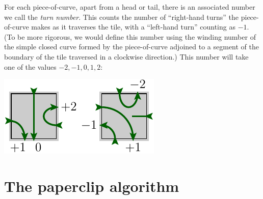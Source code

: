 \documentclass[aps, prl, letterpaper, twocolumn, superscriptaddress, notitlepage, 10pt]{revtex4-1}
\begin{document}
For each piece-of-curve, apart from a head or tail, there is an associated 
number we call the \emph{turn number}. This counts the number
of ``right-hand turns'' the piece-of-curve makes as it
traverses the tile, with a ``left-hand turn'' counting as $-1.$
(To be more rigorous, we would define this number using the
winding number of the simple closed curve formed by the
piece-of-curve adjoined to a segment of the boundary of the tile 
traversed in a clockwise direction.)
This number will take one of the values $-2, -1, 0, 1, 2:$
\begin{center}
\includegraphics[]{pic-cells-3.pdf}
\end{center}


%



%
%

\section{The paperclip algorithm}
\end{document}
